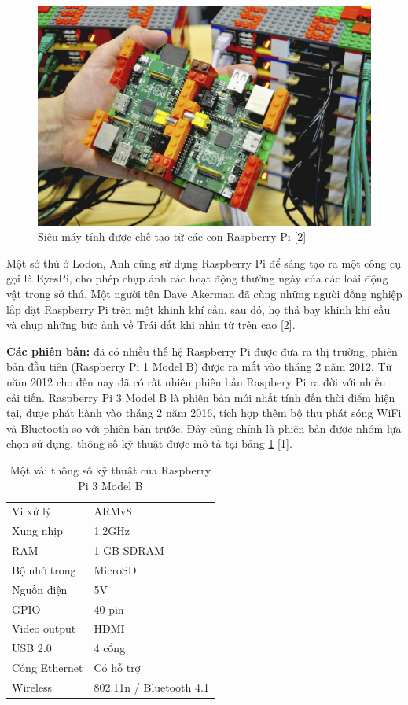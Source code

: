 \documentclass[11pt,a4paper,oneside]{book}
\begin{document}
\begin{figure}[h]
  \centering
     \includegraphics[scale=0.5]{4-Sieu-may-tinh}
  \caption{Siêu máy tính được chế tạo từ các con Raspberry Pi [2]}\label{fig:4-Sieu-may-tinh}
\end{figure}

Một sở thú ở Lodon, Anh cũng sử dụng Raspberry Pi để sáng tạo ra một công cụ gọi là EyesPi, cho phép chụp ảnh các hoạt động thường ngày của các loài động vật trong sở thú. Một người tên Dave Akerman đã cùng những người đồng nghiệp lắp đặt Raspberry Pi trên một khinh khí cầu, sau đó, họ thả bay khinh khí cầu và chụp những bức ảnh về Trái đất khi nhìn từ trên cao [2]. 

\textbf{Các phiên bản:} đã có nhiều thế hệ Raspberry Pi được đưa ra thị trường, phiên bản đầu tiên (Raspberry Pi 1 Model B) được ra mắt vào tháng 2 năm 2012. Từ năm 2012 cho đến nay đã có rất nhiều phiên bản Raspbery Pi ra đời với nhiều cải tiến. Raspberry Pi 3 Model B là phiên bản mới nhất tính đến thời điểm hiện tại, được phát hành vào tháng 2 năm 2016, tích hợp thêm bộ thu phát sóng WiFi và Bluetooth so với phiên bản trước. Đây cũng chính là phiên bản được nhóm lựa chọn sử dụng, thông số kỹ thuật được mô tả tại bảng \ref{tab:pi-3-model-b-specs} [1].

\begin{table}
\centering
\caption{Một vài thông số kỹ thuật của Raspberry Pi 3 Model B}\label{tab:pi-3-model-b-specs}
\begin{tabular}{ |l|l| } 
 \hline
	Vi xử lý		&	ARMv8\\
	Xung nhịp		&	1.2GHz\\
	RAM				&	1 GB SDRAM\\
	Bộ nhớ trong	&	MicroSD\\
	Nguồn điện		&	5V\\
	GPIO			&	40 pin\\
	Video output	&	HDMI\\
	USB 2.0			&	4 cổng\\
	Cổng Ethernet	&	Có hỗ trợ\\
	Wireless		&	802.11n / Bluetooth 4.1\\
 \hline
\end{tabular}
\end{table}
\end{document}
